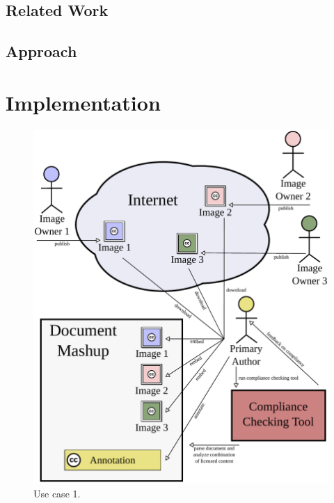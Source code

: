 \documentclass[botnum,fleqn,final]{unmeethesis}
\begin{document}
\section{\label{section:intro:rw}Related Work}

\section{\label{section:intro:approach}Approach}

\chapter{\label{chapter:impl}Implementation}

\begin{figure}[!htpb]
    \begin{center}
        \includegraphics[width=1.0\textwidth]{usecase1-27.pdf}
    \end{center}
  \caption[Use case 1]{Use case 1.}
  \label{fi:usecase1}
\end{figure}
\end{document}
